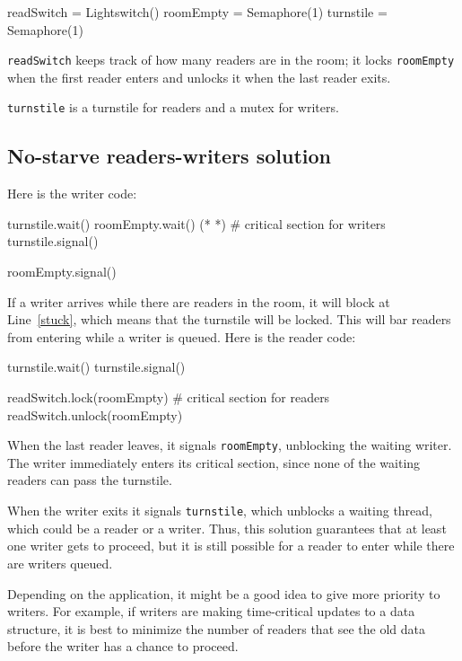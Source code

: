 \documentclass{book}
\begin{document}
\begin{unbreakable}[title={No-starve readers-writers initialization}]{}
readSwitch = Lightswitch()
roomEmpty = Semaphore(1)
turnstile = Semaphore(1)
\end{unbreakable}

{\tt readSwitch} keeps track of how many readers are in the room; it locks {\tt roomEmpty} when the first reader enters and unlocks it when the last reader exits.

    {\tt turnstile} is a turnstile for readers and a mutex for writers.



\subsection {No-starve readers-writers solution}

Here is the writer code:

\begin{unbreakable}[title={No-starve writer solution}]{}
turnstile.wait()
    roomEmpty.wait()           (* \label{stuck} *)
    # critical section for writers
turnstile.signal()

roomEmpty.signal()
\end{unbreakable}

If a writer arrives while there are readers in the room, it
will block at Line~\ref{stuck}, which means that the turnstile will
be locked.  This will bar readers from entering while a writer
is queued.  Here is the reader code:

\begin{unbreakable}[title={No-starve reader solution}]{}
turnstile.wait()
turnstile.signal()

readSwitch.lock(roomEmpty)
    # critical section for readers
readSwitch.unlock(roomEmpty)
\end{unbreakable}

When the last reader leaves, it signals {\tt roomEmpty},
unblocking the waiting writer.  The writer immediately
enters its critical section, since none of the waiting
readers can pass the turnstile.

When the writer exits it signals {\tt turnstile}, which unblocks a
waiting thread, which could be a reader or a writer.  Thus, this
solution guarantees that at least one writer gets to proceed, but it
is still possible for a reader to enter while there are writers
queued.

Depending on the application, it might be a good idea to
give more priority to writers.  For example, if writers are making
time-critical updates to a data structure, it is best
to minimize the number of readers that see the old data before
the writer has a chance to proceed.
\end{document}
